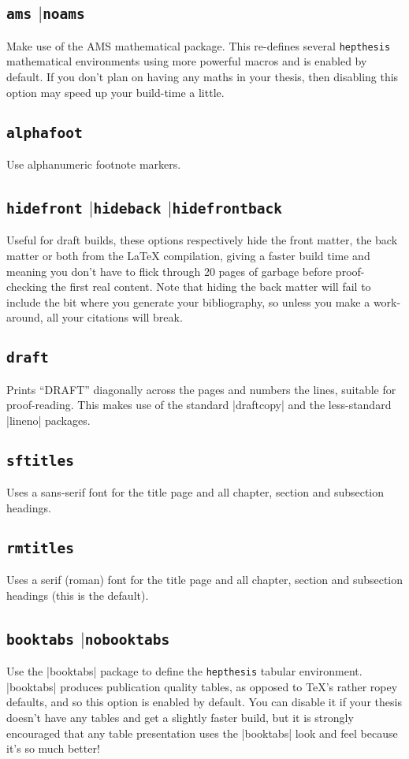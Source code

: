 \documentclass[12pt]{article}
\newcommand{\hepthesis}{\texttt{hepthesis}\xspace}
\newcommand{\Or}{\texorpdfstring{\ensuremath{\vert}\xspace}{or}}
\newcommand{\texopt}[1]{\texorpdfstring{\texttt{#1}}{#1}}
\begin{document}
\subsection{\texopt{ams} \Or \texopt{noams}}
Make use of the AMS mathematical package. This re-defines several \hepthesis
mathematical environments using more powerful macros and is enabled by default.
If you don't plan on having any maths in your thesis, then disabling this option
may speed up your build-time a little.

\subsection{\texopt{alphafoot}}
Use alphanumeric footnote markers.

\subsection{\texopt{hidefront} \Or \texopt{hideback} \Or \texopt{hidefrontback}}
Useful for draft builds, these options respectively hide the front matter, the
back matter or both from the \LaTeX{} compilation, giving a faster build time
and meaning you don't have to flick through 20 pages of garbage before
proof-checking the first real content. Note that hiding the back matter will
fail to include the bit where you generate your bibliography, so unless you make
a work-around, all your citations will break.

\subsection{\texopt{draft}}
Prints ``DRAFT'' diagonally across the pages and numbers the lines, suitable for
proof-reading. This makes use of the standard |draftcopy| and the less-standard
|lineno| packages.

\subsection{\texopt{sftitles}}
Uses a sans-serif font for the title page and all chapter, section and
subsection headings.

\subsection{\texopt{rmtitles}}
Uses a serif (roman) font for the title page and all chapter, section and
subsection headings (this is the default).

\subsection{\texopt{booktabs} \Or \texopt{nobooktabs}}
Use the |booktabs| package to define the \hepthesis tabular environment.
|booktabs| produces publication quality tables, as opposed to \TeX's rather
ropey defaults, and so this option is enabled by default. You can disable it if
your thesis doesn't have any tables and get a slightly faster build, but it is
strongly encouraged that any table presentation uses the |booktabs| look and
feel because it's so much better!
\end{document}
